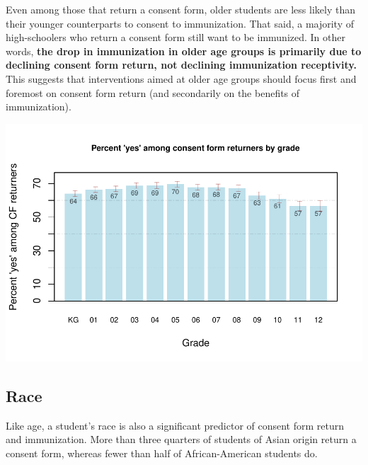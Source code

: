 \begin{multicols}{2}
Even among those that return a consent form, older students are less likely than their younger counterparts to consent to immunization.  That said, a majority of high-schoolers who return a consent form still want to be immunized.  In other words, \textbf{the drop in immunization in older age groups is primarily due to declining consent form return, not declining immunization receptivity.}   This suggests that interventions aimed at older age groups should focus first and foremost on consent form return (and secondarily on the benefits of immunization).


\begin{center}
\includegraphics{targeting-003}
\end{center}

\subsection*{Race}

Like age, a student's race is also a significant predictor of consent form return and immunization.  More than three quarters of students of Asian origin return a consent form, whereas fewer than half of African-American students do.  


\end{multicols}
